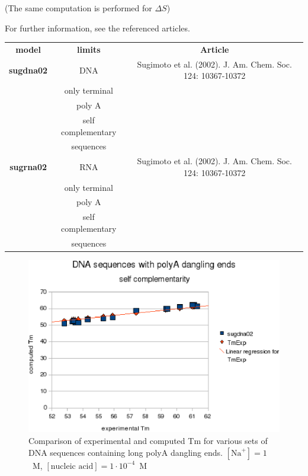 \documentclass{article}
\begin{document}
       (The same computation is performed for $\Delta S$)

For further information, see the referenced articles.

\begin{table}[h]
\begin{tabular}[h]{| c | c | c |}
\textbf{model} & \textbf{limits} & \textbf{Article} \\
\textbf{sugdna02} & DNA & Sugimoto et al. (2002). J. Am. Chem. Soc. 124: 10367-10372 \\
& only terminal & \\
 & poly A & \\
 & self complementary & \\
 & sequences & \\
\textbf{sugrna02} & RNA & Sugimoto et al. (2002). J. Am. Chem. Soc. 124: 10367-10372 \\
& only terminal & \\
 & poly A & \\
 & self complementary & \\
 & sequences & \\
\end{tabular}
\end{table}

\begin{figure}[h]
\includegraphics{images/DNALongDanglingEnd.eps}
\caption{Comparison of experimental and computed Tm for various sets of
 DNA sequences containing long polyA dangling ends. $[\mbox{Na}^+] = 1$~M, $[\mbox{nucleic acid}] = 1\cdot{}10^{-4}$~M}
\end{figure}
\end{document}

